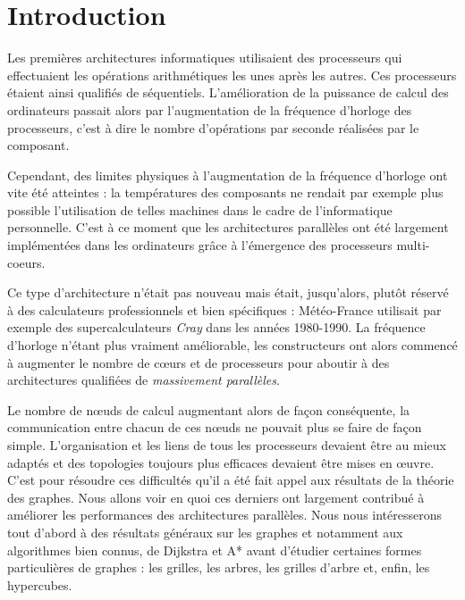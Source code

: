 \section*{Introduction}

Les premières architectures informatiques utilisaient des processeurs qui effectuaient les opérations arithmétiques les unes après les autres. Ces processeurs étaient ainsi qualifiés de séquentiels. L'amélioration de la puissance de calcul des ordinateurs passait alors par l'augmentation de la fréquence d'horloge des processeurs, c'est à dire le nombre d'opérations par seconde réalisées par le composant.

Cependant, des limites physiques à l'augmentation de la fréquence d'horloge ont vite été atteintes : la températures des composants ne rendait par exemple plus possible l'utilisation de telles machines dans le cadre de l'informatique personnelle. C'est à ce moment que les architectures parallèles ont été largement implémentées dans les ordinateurs grâce à l'émergence des processeurs multi-coeurs.

Ce type d'architecture n'était pas nouveau mais était, jusqu'alors, plutôt réservé à des calculateurs professionnels et bien spécifiques : Météo-France utilisait par exemple des supercalculateurs \textit{Cray} dans les années 1980-1990. La fréquence d'horloge n'étant plus vraiment améliorable, les constructeurs ont alors commencé à augmenter le nombre de cœurs et de processeurs pour aboutir à des architectures qualifiées de \textit{massivement parallèles}.

Le nombre de nœuds de calcul augmentant alors de façon conséquente, la communication entre chacun de ces nœuds ne pouvait plus se faire de façon simple. L'organisation et les liens de tous les processeurs devaient être au mieux adaptés et des topologies toujours plus efficaces devaient être mises en œuvre. C'est pour résoudre ces difficultés qu'il a été fait appel aux résultats de la théorie des graphes. Nous allons voir en quoi ces derniers ont largement contribué à améliorer les performances des architectures parallèles. Nous nous intéresserons tout d'abord à des résultats généraux sur les graphes et notamment aux algorithmes bien connus, de Dijkstra et A* avant d'étudier certaines formes particulières de graphes : les grilles, les arbres, les grilles d'arbre et, enfin, les hypercubes.